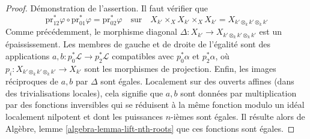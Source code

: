 \begin{proof}
\medskip\noindent
Démonstration de l'assertion. Il faut vérifier que
$$
\text{pr}_{12}^*\varphi \circ
\text{pr}_{01}^*\varphi =
\text{pr}_{02}^*\varphi
\quad\text{sur}\quad
X_{k'} \times_X X_{k'} \times_X X_{k'} = X_{k' \otimes_k k' \otimes_k k'}
$$
Comme précédemment, le morphisme diagonal
$\Delta : X_{k'} \to X_{k' \otimes_k k' \otimes_k k'}$
est un épaississement. Les membres de gauche et de droite de l'égalité
sont des applications $a, b : p_0^*\mathcal{L} \to p_2^*\mathcal{L}$ compatibles avec
$p_0^*\alpha$ et $p_2^*\alpha$, où
$p_i : X_{k' \otimes_k k' \otimes_k k'} \to X_{k'}$
sont les morphismes de projection. Enfin, les images réciproques de $a, b$ par
$\Delta$ sont égales.
Localement sur des ouverts affines (dans des trivialisations locales), cela signifie que
$a, b$ sont données par multiplication par des fonctions inversibles
qui se réduisent à la même fonction modulo un idéal localement nilpotent
et dont les puissances $n$-ièmes sont égales. Il résulte alors de
Algèbre, lemme \ref{algebra-lemma-lift-nth-roots}
que ces fonctions sont égales.
\end{proof}











